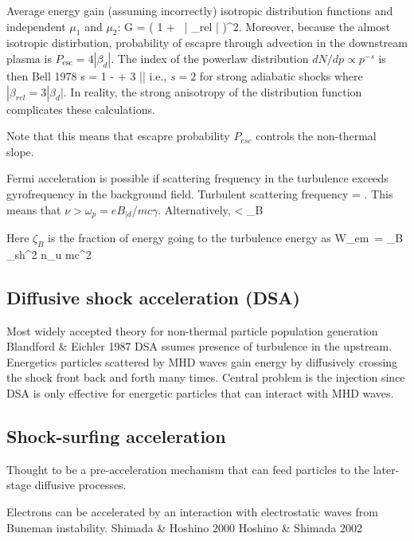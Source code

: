 \documentclass{aa}
\begin{document}
Average energy gain (assuming incorrectly) isotropic distribution functions and independent $\mu_1$ and $\mu_2$:
\be
\langle G \rangle = \left( 1 +  | \beta_{rel} | \right)^2.
\ee
Moreover, because the almost isotropic distirbution, probability of escapre through advection in the downstream plasma is $ P_{\mathrm{esc}} = 4 | \beta_d | $.
The index of the powerlaw distribution $dN/dp \propto p^{-s}$ is then Bell 1978
\be
s = 1 -  
     + 3 ||
\ee
i.e., $s=2$ for strong adiabatic shocks where $|\beta_{rel} = 3 | \beta_d |$.
In reality, the strong anisotropy of the distribution function complicates these calculations.

Note that this means that escapre probability $P_{esc}$ controls the non-thermal slope.

Fermi acceleration is possible if scattering frequency in the turbulence exceeds gyrofrequency in the background field.
Turbulent scattering frequency
\be
\nu = .
\ee
This means that $\nu > \omega_p = e B_{|d}/m c \gamma$.
Alternatively,
\be
\sqrt{\sigma} < \zeta_B
\ee

Here $\zeta_B$ is the fraction of energy going to the turbulence energy as
\be
W_{em} = \zeta_B \gamma_{sh}^2 n_u mc^2
\ee




\subsection{Diffusive shock acceleration (DSA)}
Most widely accepted theory for non-thermal particle population generation 
Blandford \& Eichler 1987
DSA ssumes presence of turbulence in the upstream.
Energetics particles scattered by MHD waves gain energy by diffusively crossing the shock front back and forth many times.
Central problem is the injection since DSA is only effective for energetic particles that can interact with MHD waves.


\subsection{Shock-surfing acceleration}
Thought to be a pre-acceleration mechanism that can feed particles to the later-stage diffusive processes.

Electrons can be accelerated by an interaction with electrostatic waves from Buneman instability.
Shimada \& Hoshino 2000
Hoshino \& Shimada 2002
\end{document}
